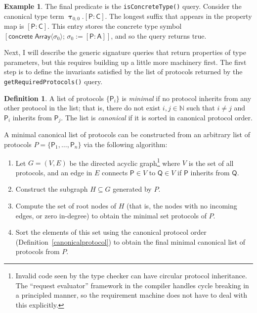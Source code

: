\documentclass[headsepline,bibliography=totoc]{scrreport}
\newcommand{\namesym}[1]{\mathsf{#1}}
\newcommand{\proto}[1]{\bm{\mathsf{#1}}}
\newcommand{\genericsym}[2]{\bm{\uptau}_{#1,#2}}
\newcommand{\assocsym}[2]{[\proto{#1}\colon\namesym{#2}]}
\newcommand{\concretesym}[1]{[\mathsf{concrete}\;#1]}
\theoremstyle{definition}
\newtheorem{example}{Example}[chapter]
\theoremstyle{definition}
\newtheorem{definition}{Definition}[chapter]
\theoremstyle{definition}
\begin{document}
\begin{example}
The final predicate is the \texttt{isConcreteType()} query. Consider the canonical type term $\genericsym{0}{0}.\assocsym{P}{C}$. The longest suffix that appears in the property map is $\assocsym{P}{C}$. This entry stores the concrete type symbol $\concretesym{\namesym{Array}\langle\sigma_0\rangle;\,\sigma_0:=\assocsym{P}{A}}$, and so the query returns true.
\end{example}

Next, I will describe the generic signature queries that return properties of type parameters, but this requires building up a little more machinery first. The first step is to define the invariants satisfied by the list of protocols returned by the \texttt{getRequiredProtocols()} query.

\begin{definition}\label{minimalproto} A list of protocols $\{\proto{P}_i\}$ is \emph{minimal} if
no
protocol inherits from any other protocol in the list; that is, there do not exist $i,
j\in\mathbb{N}$ such that $i\neq j$ and $\proto{P}_i$ inherits from $\proto{P}_j$. The list is
\emph{canonical}
if it is sorted in canonical protocol order.

A minimal canonical list of protocols
can be constructed from an arbitrary list of protocols
$P=\{\proto{P}_1,\ldots,\proto{P}_n\}$ via the following algorithm:
\begin{enumerate}
\item Let $G=(V, E)$ be the directed acyclic graph\footnote{Invalid code seen by the
type checker can have circular protocol inheritance. The ``request evaluator''
framework in the compiler handles cycle breaking in a principled manner, so the
requirement machine does not have to deal with this explicitly.} where $V$ is the set
of all protocols, and an edge in $E$ connects $\proto{P}\in V$ to $\proto{Q}\in V$ if
$\proto{P}$ inherits from $\proto{Q}$.
\item Construct the subgraph $H\subseteq G$ generated by $P$.
\item Compute the set of root nodes of $H$ (that is, the nodes with no incoming edges, or zero in-degree) to obtain the minimal set protocols of
$P$.
\item Sort the elements of this set using the canonical protocol order (Definition~\ref{canonicalprotocol}) to obtain the
final minimal canonical list of protocols from $P$.
\end{enumerate}
\end{definition}
\end{document}
